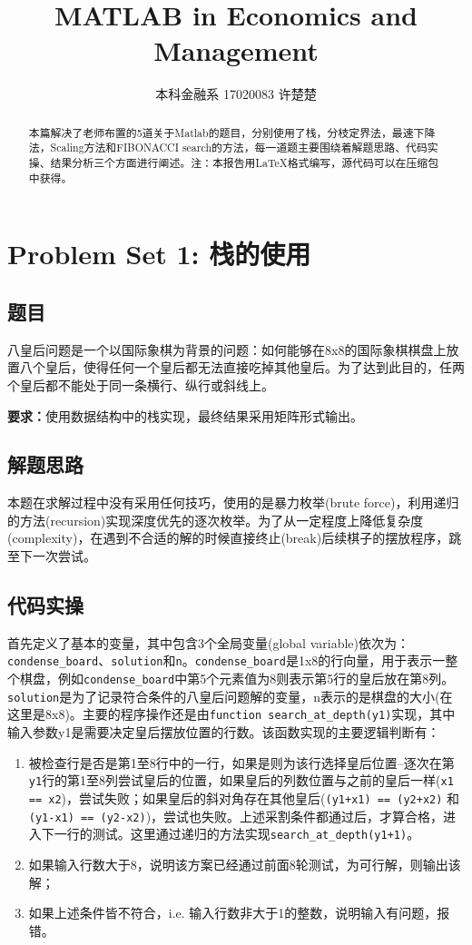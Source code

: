 \documentclass[a4paper, 12pt]{ctexart}  %
\title{\textbf{MATLAB in Economics and Management}}
\author{本科金融系 17020083 许楚楚}
\date{\zhtoday}
\begin{document}
 
\maketitle

\begin{abstract}本篇解决了老师布置的5道关于Matlab的题目，分别使用了栈，分枝定界法，最速下降法，Scaling方法和FIBONACCI search的方法，每一道题主要围绕着解题思路、代码实操、结果分析三个方面进行阐述。注：本报告用\LaTeX{}格式编写，源代码可以在压缩包中获得。
\end{abstract}
\tableofcontents

\section{Problem Set 1: 栈的使用}
\subsection{题目}
八皇后问题是一个以国际象棋为背景的问题：如何能够在8x8的国际象棋棋盘上放置八个皇后，使得任何一个皇后都无法直接吃掉其他皇后。为了达到此目的，任两个皇后都不能处于同一条横行、纵行或斜线上。

\textbf{要求：}使用数据结构中的栈实现，最终结果采用矩阵形式输出。

\subsection{解题思路}
 本题在求解过程中没有采用任何技巧，使用的是暴力枚举(brute force)，利用递归的方法(recursion)实现深度优先的逐次枚举。为了从一定程度上降低复杂度(complexity)，在遇到不合适的解的时候直接终止(break)后续棋子的摆放程序，跳至下一次尝试。
\subsection{代码实操}
首先定义了基本的变量，其中包含3个全局变量(global variable)依次为：\verb|condense_board|、\verb|solution|和\verb|n|。\verb|condense_board|是1x8的行向量，用于表示一整个棋盘，例如\verb|condense_board|中第5个元素值为8则表示第5行的皇后放在第8列。\verb|solution|是为了记录符合条件的八皇后问题解的变量，n表示的是棋盘的大小(在这里是8x8)。主要的程序操作还是由\verb|function search_at_depth(y1)|实现，其中输入参数y1是需要决定皇后摆放位置的行数。该函数实现的主要逻辑判断有：
\begin{enumerate}
\item 被检查行是否是第1至8行中的一行，如果是则为该行选择皇后位置--逐次在第\verb|y1|行的第1至8列尝试皇后的位置，如果皇后的列数位置与之前的皇后一样(\verb|x1 == x2|)，尝试失败；如果皇后的斜对角存在其他皇后(\verb|(y1+x1) == (y2+x2)| 和\verb|(y1-x1) == (y2-x2)|)，尝试也失败。上述采割条件都通过后，才算合格，进入下一行的测试。这里通过递归的方法实现\verb|search_at_depth(y1+1)|。
\item 如果输入行数大于8，说明该方案已经通过前面8轮测试，为可行解，则输出该解；
\item 如果上述条件皆不符合，i.e. 输入行数非大于1的整数，说明输入有问题，报错。
\end{enumerate}
\end{document}
